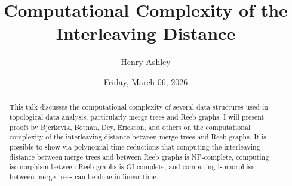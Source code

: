 \documentclass{UAmathtalk}
\author{Henry Ashley}
\title{Computational Complexity of the Interleaving Distance}
\date{Friday, March 06, 2026}
\begin{document}
\maketitle

\begin{abstract}
This talk discusses the computational complexity of several data structures used in topological data analysis, particularly merge trees and Reeb graphs. I will present proofs by Bjerkevik, Botnan, Dey, Erickson, and others on the computational complexity of the interleaving distance between merge trees and Reeb graphs. It is possible to show via polynomial time reductions that computing the interleaving distance between merge trees and between Reeb graphs is NP-complete, computing isomorphism between Reeb graphs is GI-complete, and computing isomorphism between merge trees can be done in linear time.
\end{abstract}
\end{document}
